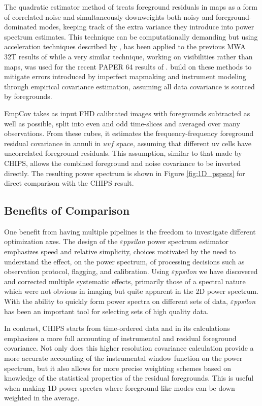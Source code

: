 \documentclass[twolcolumn,iop]{emulateapj}
\def\eppsilon{{\it $\varepsilon$ppsilon}}
\def\empirical{EmpCov}
\def\dilloncite{\cite{PhysRevD.91.123011} }
\begin{document}
The quadratic estimator method of \cite{Liu:2011p8763} treats foreground residuals in maps as a form of correlated noise and simultaneously downweights both noisy and foreground-dominated modes, keeping track of the extra variance they introduce into power spectrum estimates. This technique can be computationally demanding but using acceleration techniques described by \cite{Dillon:2013p10497}, has been applied to the previous MWA 32T results of \cite{Dillon:2014p9788} while a very similar technique, working on visibilities rather than maps, was used for the recent PAPER 64 results of \cite{2015ApJ...809...61A}.  \dilloncite{} build on these methods to mitigate errors introduced by imperfect mapmaking and instrument modeling through empirical covariance estimation, assuming all data covariance is sourced by foregrounds.

\empirical{} takes as input FHD calibrated images with foregrounds subtracted as well as possible, split into even and odd time-slices and averaged over many observations. From these cubes, it estimates the frequency-frequency foreground residual covariance in annuli in $uvf$ space, assuming that different uv cells have uncorrelated foreground residuals. This assumption, similar to that made by CHIPS, allows the combined foreground and noise covariance to be inverted directly. The resulting power spectrum is shown in Figure \ref{fig:1D_pspecs} for direct comparison with the CHIPS result. 



\subsection{Benefits of Comparison}
\label{sec:benefits_of_comparison}


One benefit from having multiple pipelines is the freedom to investigate  different optimization axes.  The design of the \eppsilon{} power spectrum estimator emphasizes speed and relative simplicity, choices  motivated by the need to understand the effect, on the power spectrum, of processing decisions such as observation protocol, flagging, and calibration. Using \eppsilon{} we have discovered and corrected multiple systematic effects, primarily those of a spectral nature which were not obvious in imaging but quite apparent in the 2D power spectrum. With the ability to quickly form power spectra on different sets of data, \eppsilon{} has been an important tool for selecting sets of high quality data. 

In contrast, CHIPS starts from time-ordered data and in its calculations emphasizes a more full accounting of instrumental and residual foreground covariance. Not only does this higher resolution covariance calculation provide a more accurate accounting of the instrumental window function on the power spectrum, but it also allows for more precise weighting schemes based on knowledge of the statistical properties of the residual foregrounds. This is useful when making 1D power spectra where foreground-like modes can be down-weighted in the average. 
\end{document}
